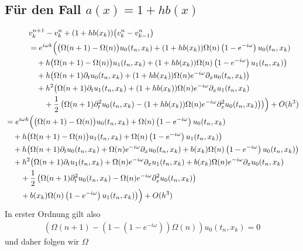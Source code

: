 \subsection*{Für den Fall $a(x) = 1 + h b(x)$}
{\small \begin{align}
\begin{split}
&v^{n+1}_k - v^n_k + (1 + h b(x_k)) \bigl( v^n_k - v^n_{k-1} \bigr)\\
&= e^{i \omega k} \Bigl(
\bigl(\Omega(n+1) - \Omega(n) \bigr) u_0(t_n, x_k) + (1 + h b(x_k)) \Omega(n) \left(1-e^{-i \omega}\right) u_0(t_n, x_k)\\
&\quad + h \bigl(\Omega(n+1) - \Omega(n) \bigr) u_1(t_n, x_k) + (1 + h b(x_k)) \Omega(n) \left(1-e^{-i \omega}\right) u_1(t_n, x_k) \bigr)\\
&\quad + h \bigl( \Omega(n+1) \partial_t u_0(t_n, x_k) + (1 + h b(x_k)) \Omega(n) e^{-i \omega} \partial_x u_0(t_n, x_k) \bigr)\\
&\quad + h^2 \bigl( \Omega(n+1) \partial_t u_1(t_n, x_k) + (1 + h b(x_k)) \Omega(n) e^{-i \omega} \partial_x u_1(t_n, x_k)\\
&\qquad + \frac{1}{2} \left( \Omega(n+1) \partial^2_t u_0(t_n, x_k) - (1 + h b(x_k)) \Omega(n) e^{-i \omega} \partial^2_x u_0(t_n, x_k) \right) \bigr)
\Bigr) + O(h^3)
\end{split}\\
\begin{split}
&= e^{i \omega k} \Bigl(
\bigl(\Omega(n+1) - \Omega(n) \bigr) u_0(t_n, x_k) + \Omega(n) \left(1-e^{-i \omega}\right) u_0(t_n, x_k)\\
&\quad + h \bigl(\Omega(n+1) - \Omega(n) \bigr) u_1(t_n, x_k) + \Omega(n) \left(1-e^{-i \omega}\right) u_1(t_n, x_k) \bigr)\\
&\quad + h \bigl( \Omega(n+1) \partial_t u_0(t_n, x_k) + \Omega(n) e^{-i \omega} \partial_x u_0(t_n, x_k) + b(x_k) \Omega(n) \left(1-e^{-i \omega}\right) u_0(t_n, x_k) \bigr)\\
&\quad + h^2 \bigl( \Omega(n+1) \partial_t u_1(t_n, x_k) + \Omega(n) e^{-i \omega} \partial_x u_1(t_n, x_k) + b(x_k) \Omega(n) e^{-i \omega} \partial_x u_0(t_n, x_k)\\
&\qquad + \frac{1}{2} \left( \Omega(n+1) \partial^2_t u_0(t_n, x_k) - \Omega(n) e^{-i \omega} \partial^2_x u_0(t_n, x_k) \right)\\
&\qquad + b(x_k) \Omega(n) \left(1-e^{-i \omega}\right) u_1(t_n, x_k) \bigr) 
\Bigr) + O(h^3)
\end{split}
\end{align}}
In erster Ordnung gilt also
\begin{align}
\left( \Omega(n+1) - \left( 1 - \left(1-e^{-i \omega}\right) \right) \Omega(n)  \right) u_0(t_n, x_k) = 0
\end{align}
und daher folgen wir $\Omega$